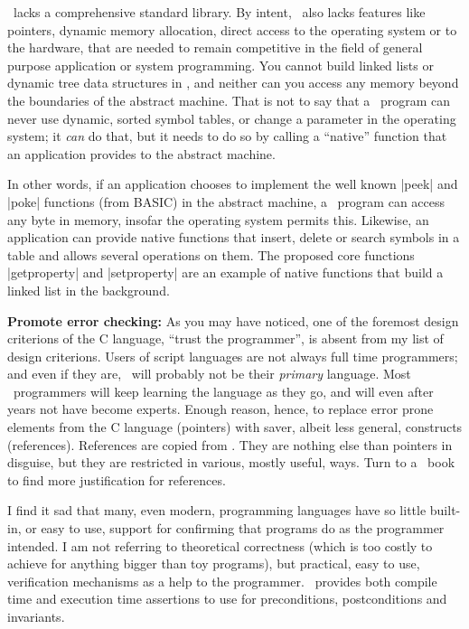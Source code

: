 {{\Small\ lacks a comprehensive standard library. By intent, \Small\ also lacks
features like pointers, dynamic memory allocation, direct access to the
operating system or to the hardware, that are needed to remain competitive in
the field of general purpose application or system programming. You cannot
build linked lists or dynamic tree data structures in \Small, and neither can
you access any memory beyond the boundaries of the abstract machine. That is
not to say that a \Small\ program can never use dynamic, sorted symbol tables,
or change a parameter in the operating system; it {\it can\/} do that, but it
needs to do so by calling a ``native'' function that an application provides
to the abstract machine.

In other words, if an application chooses to implement the well known |peek|
and |poke| functions (from BASIC) in the abstract machine, a \Small\ program can
access any byte in memory, insofar the operating system permits this.
Likewise, an application can provide native functions that insert, delete or
search symbols in a table and allows several operations on them. The proposed
core functions |getproperty| and |setproperty| are an example of native
functions that build a linked list in the background.

{\bf Promote error checking:} As you may have noticed, one of the foremost
design criterions of the C language, ``trust the programmer'', is absent from
my list of design criterions. Users of script languages are not always full
time programmers; and even if they are, \Small\ will probably not be their
{\it primary\/} language. Most \Small\ programmers will keep learning the language
as they go, and will even after years not have become experts. Enough reason,
hence, to replace error prone elements from the C language (pointers) with
saver, albeit less general, constructs (references).
References are copied from \Cpp. They are nothing else than pointers in
disguise, but they are restricted in various, mostly useful, ways. Turn to a
\Cpp\ book to find more justification for references.

I find it sad that many, even modern, programming languages have so
little built-in, or easy to use, support for confirming that programs do as the
programmer intended. I am not referring to theoretical correctness (which is
too costly to achieve for anything bigger than toy programs), but practical,
easy to use, verification mechanisms as a help to the programmer. \Small\ provides
both compile time and execution time assertions to use for preconditions,
postconditions and invariants.

}}
